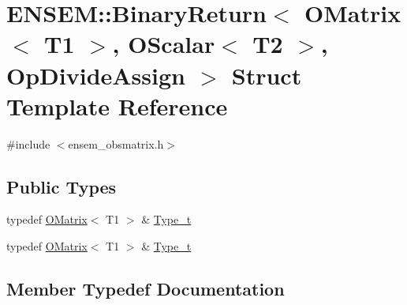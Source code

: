 \hypertarget{structENSEM_1_1BinaryReturn_3_01OMatrix_3_01T1_01_4_00_01OScalar_3_01T2_01_4_00_01OpDivideAssign_01_4}{}\section{E\+N\+S\+EM\+:\+:Binary\+Return$<$ O\+Matrix$<$ T1 $>$, O\+Scalar$<$ T2 $>$, Op\+Divide\+Assign $>$ Struct Template Reference}
\label{structENSEM_1_1BinaryReturn_3_01OMatrix_3_01T1_01_4_00_01OScalar_3_01T2_01_4_00_01OpDivideAssign_01_4}


{\ttfamily \#include $<$ensem\+\_\+obsmatrix.\+h$>$}

\subsection*{Public Types}
\begin{DoxyCompactItemize}
\item 
typedef \mbox{\hyperlink{classENSEM_1_1OMatrix}{O\+Matrix}}$<$ T1 $>$ \& \mbox{\hyperlink{structENSEM_1_1BinaryReturn_3_01OMatrix_3_01T1_01_4_00_01OScalar_3_01T2_01_4_00_01OpDivideAssign_01_4_a102ea2da5914e62170be58225f52a842}{Type\+\_\+t}}
\item 
typedef \mbox{\hyperlink{classENSEM_1_1OMatrix}{O\+Matrix}}$<$ T1 $>$ \& \mbox{\hyperlink{structENSEM_1_1BinaryReturn_3_01OMatrix_3_01T1_01_4_00_01OScalar_3_01T2_01_4_00_01OpDivideAssign_01_4_a102ea2da5914e62170be58225f52a842}{Type\+\_\+t}}
\end{DoxyCompactItemize}


\subsection{Member Typedef Documentation}
\mbox{\label{structENSEM_1_1BinaryReturn_3_01OMatrix_3_01T1_01_4_00_01OScalar_3_01T2_01_4_00_01OpDivideAssign_01_4_a102ea2da5914e62170be58225f52a842}} 
